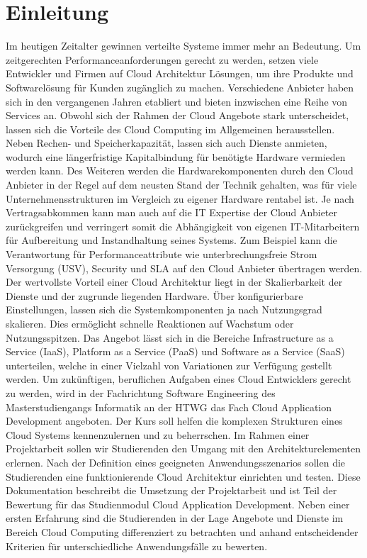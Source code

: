 \section{Einleitung}

Im heutigen Zeitalter gewinnen verteilte Systeme immer mehr an Bedeutung. Um zeitgerechten Performanceanforderungen gerecht zu werden,  setzen viele Entwickler und Firmen auf Cloud Architektur Lösungen, um ihre Produkte und Softwarelösung für Kunden zugänglich zu machen.
Verschiedene Anbieter haben sich in den vergangenen Jahren etabliert und bieten inzwischen eine Reihe von Services an. Obwohl sich der Rahmen der Cloud Angebote stark unterscheidet, lassen sich die Vorteile des Cloud Computing im Allgemeinen herausstellen. Neben Rechen- und Speicherkapazität, lassen sich auch Dienste anmieten, wodurch eine längerfristige Kapitalbindung für benötigte Hardware vermieden werden kann. Des Weiteren werden die Hardwarekomponenten durch den Cloud Anbieter in der Regel auf dem neusten Stand der Technik gehalten, was für viele Unternehmensstrukturen im Vergleich zu eigener Hardware rentabel ist.  Je nach Vertragsabkommen kann man auch auf die IT Expertise der Cloud Anbieter zurückgreifen und verringert somit die Abhängigkeit von eigenen IT-Mitarbeitern für Aufbereitung und Instandhaltung seines Systems. Zum Beispiel kann die Verantwortung für Performanceattribute wie unterbrechungsfreie Strom Versorgung (USV), Security und SLA auf den Cloud Anbieter übertragen werden.  Der wertvollste Vorteil einer Cloud Architektur liegt in der Skalierbarkeit der Dienste und der zugrunde liegenden Hardware. Über konfigurierbare Einstellungen, lassen sich die Systemkomponenten ja nach Nutzungsgrad skalieren. Dies ermöglicht schnelle Reaktionen auf Wachstum oder Nutzungsspitzen. Das Angebot lässt sich in die Bereiche Infrastructure as a Service (IaaS), Platform as a Service (PaaS) und Software as a Service  (SaaS) unterteilen, welche in einer Vielzahl von Variationen zur Verfügung gestellt werden.
Um zukünftigen, beruflichen Aufgaben eines Cloud Entwicklers gerecht zu werden, wird in der Fachrichtung Software Engineering des Masterstudiengangs Informatik an der HTWG das Fach Cloud Application Development angeboten. Der Kurs soll helfen die komplexen Strukturen eines Cloud Systems kennenzulernen und zu beherrschen. Im Rahmen einer Projektarbeit sollen wir Studierenden den Umgang mit den Architekturelementen erlernen. Nach der Definition eines geeigneten Anwendungsszenarios sollen die Studierenden eine funktionierende Cloud Architektur einrichten und testen.
Diese Dokumentation beschreibt die Umsetzung der Projektarbeit und ist Teil der Bewertung für das Studienmodul Cloud Application Development. Neben einer ersten Erfahrung sind die Studierenden in der Lage Angebote und Dienste im Bereich Cloud Computing differenziert zu betrachten und anhand entscheidender Kriterien für unterschiedliche Anwendungsfälle zu bewerten. 


